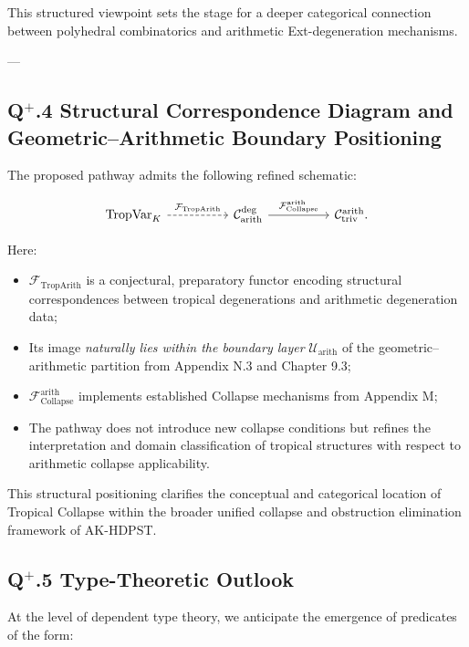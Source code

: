 \documentclass[11pt]{article}
\begin{document}
This structured viewpoint sets the stage for a deeper categorical connection between polyhedral combinatorics and arithmetic Ext-degeneration mechanisms.


---

\subsection*{Q$^{+}$.4 Structural Correspondence Diagram and Geometric–Arithmetic Boundary Positioning}

The proposed pathway admits the following refined schematic:

\[
\begin{tikzcd}[column sep=huge, row sep=large]
\mathrm{TropVar}_K \arrow[r, dashed, "\mathcal{F}_{\mathrm{TropArith}}"] 
& \mathcal{C}_{\mathrm{arith}}^{\mathrm{deg}} \arrow[r, "\mathcal{F}_{\mathrm{Collapse}}^{\mathrm{arith}}"]
& \mathcal{C}_{\mathrm{triv}}^{\mathrm{arith}}.
\end{tikzcd}
\]

Here:

\begin{itemize}
    \item \( \mathcal{F}_{\mathrm{TropArith}} \) is a conjectural, preparatory functor encoding structural correspondences between tropical degenerations and arithmetic degeneration data;
    \item Its image \emph{naturally lies within the boundary layer} \( \mathcal{U}_{\mathrm{arith}} \) of the geometric–arithmetic partition from Appendix N.3 and Chapter 9.3;
    \item \( \mathcal{F}_{\mathrm{Collapse}}^{\mathrm{arith}} \) implements established Collapse mechanisms from Appendix M;
    \item The pathway does not introduce new collapse conditions but refines the interpretation and domain classification of tropical structures with respect to arithmetic collapse applicability.
\end{itemize}

This structural positioning clarifies the conceptual and categorical location of Tropical Collapse within the broader unified collapse and obstruction elimination framework of AK-HDPST.


\subsection*{Q$^{+}$.5 Type-Theoretic Outlook}

At the level of dependent type theory, we anticipate the emergence of predicates of the form:
\end{document}
